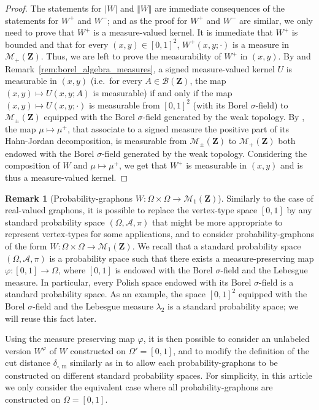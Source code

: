 \documentclass{amsart}
\newcommand{\ie}{i.e.\ }
\theoremstyle{plain}
\theoremstyle{definition}
\newtheorem{remark}[Th]{Remark}
\newcommand{\Space}{\mathbf{Z}}
\newcommand{\Borel}{\mathcal{B}(\Space)}
\newcommand{\Proba}{\mathcal{M}_1(\Space)}
\newcommand{\Meas}{\mathcal{M}_+(\Space)}
\newcommand{\SignedMeas}{\mathcal{M}_{\pm}(\Space)}
\newcommand{\m}{\mathrm{m}}
\newcommand{\ddcut}{\delta_{\square,\m}}
\begin{document}
\begin{proof}
The statements for $\vert W \vert$ and $\Vert W \Vert$ are immediate consequences
of the statements for $W^+$ and $W^-$;
and as the proof for $W^+$ and $W^-$ are similar,
we only need to prove that $W^+$ is a measure-valued kernel.
It is immediate that $W^+$ is bounded and that for every $(x,y)\in [0,1]^2$,
$W^+(x,y;\cdot)$ is a measure in $\Meas$.
Thus, we are left to prove the measurability of $W^+$ in $(x,y)$.
By \cite[Proposition 2.1]{MeasurableSetsMeasures} and Remark~\ref{rem:borel_algebra_measures},
a signed measure-valued kernel $U$ is measurable in $(x,y)$
(\ie for every $A\in\Borel$, the map $(x,y)\mapsto U(x,y;A)$ is measurable)
if and only if the map $(x,y)\mapsto U(x,y;\cdot)$ is measurable
from $[0,1]^2$ (with its Borel $\sigma$-field) to $\SignedMeas$ 
equipped with the Borel $\sigma$-field generated by the weak topology.
By \cite[Theorem 2.8]{MeasurableSetsMeasures},
the map $\mu \mapsto \mu^+$, 
that associate to a signed measure the positive part 
	of its Hahn-Jordan decomposition,
is measurable from $\SignedMeas$ to $\Meas$ both endowed
with the Borel $\sigma$-field generated by the weak topology.
Considering the composition of $W$ and $\mu\mapsto\mu^+$, 
we get that $W^+$ is measurable in $(x,y)$
and is thus a measure-valued kernel.
\end{proof}



\begin{remark}[Probability-graphons $W : \Omega\times \Omega \to \Proba$]
	\label{rem_vertex_type_omega}
Similarly to the case of real-valued graphons,
it is possible to replace the vertex-type space $[0,1]$
by any standard probability space $(\Omega,\mathcal{A},\pi)$
	that might be more appropriate to represent vertex-types for some applications,
and to consider probability-graphons of the form
$W : \Omega\times \Omega \to \Proba$.
We recall that a standard probability space $(\Omega,\mathcal{A},\pi)$
	is a probability space such that there exists 
	a measure-preserving map $\varphi : [0,1] \to \Omega$,
	where $[0,1]$ is endowed with the Borel $\sigma$-field
		and  the Lebesgue measure.
In particular, every Polish space endowed with its Borel $\sigma$-field is a standard probability space.
As an example, the space $[0,1]^2$ equipped with the Borel $\sigma$-field
		and the  Lebesgue measure $\lambda_2$ 
	is a standard probability space;
	we will reuse this fact later.

Using the measure preserving map $\varphi$, it is then possible to 
	consider an unlabeled version $W^\varphi$  of $W$ constructed on $\Omega' = [0,1]$,
and to modify the definition of the cut distance $\ddcut$ 
	similarly as in \cite[Theorem 6.9]{jansonGraphonsCutNorm2013}
	to allow each probability-graphons to be constructed on different standard probability spaces.
For simplicity, in this article we only consider the equivalent case where all probability-graphons are constructed on $\Omega = [0,1]$.
\end{remark}
\end{document}

